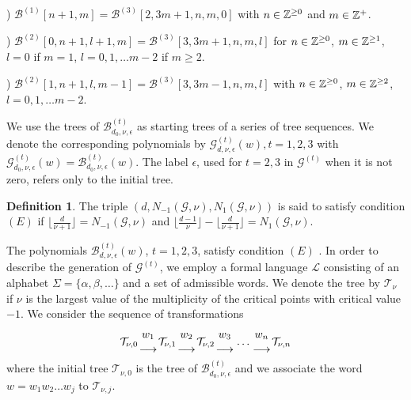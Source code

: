 \documentclass{birkjour_t2}
\theoremstyle{definition}
\newtheorem{defn}[thm]{Definition}
\theoremstyle{remark}
\numberwithin{equation}{section}
\begin{document}
 \bigskip\par{}) ${\mathcal{B}}^{(1)}[n+1, m]={\mathcal{B}}^{(3)}[2, 3m+1,n,m,0]$ with $n\in {\Bbb{Z}}^{\geq 0}$ and $m\in {\Bbb{Z}}^{+}$. 
 \bigskip\par{}) ${\mathcal{B}}^{(2)}[0, n+1, l+1, m]={\mathcal{B}}^{(3)}[3, 3m+1,n,m,l]$ for $n\in {\Bbb{Z}}^{\geq 0}$,  $m\in {\Bbb{Z}}^{\geq 1}$, $l=0$ if $m=1$, $l=0,1, \dots m-2$ if $m \geq 2$.
\bigskip\par{}) ${\mathcal{B}}^{(2)}[1, n+1, l, m-1]={\mathcal{B}}^{(3)}[3, 3m-1, n, m, l]$ with $n\in {\Bbb{Z}}^{\geq 0}$, $m\in {\Bbb{Z}}^{\geq 2}$, $l=0,1, \dots m-2$. 
 \bigskip\par
 We use the trees of ${\mathcal{B}}_{d_{0},\nu,\epsilon}^{(t)}$ as starting trees of a series of tree sequences. 
We denote the corresponding polynomials by ${\mathcal{G}}^{(t)}_{d,\nu,\epsilon}(w), t=1,2, 3$ with ${\mathcal{G}}^{(t)}_{d_{0},\nu,\epsilon}(w)={\mathcal{B}}_{d_{0},\nu,\epsilon}^{(t)}(w)$. The label $\epsilon$, used for $t=2,3$ in ${\mathcal{G}}^{(t)}$ when it is not zero, refers only to the initial tree.
\par
     \begin{defn} 
     The triple $(d,N_{-1}(\mathcal{G}, \nu), N_{1}(\mathcal{G}, \nu))$ is said to satisfy condition $(E)$  if $ \Big \lfloor \frac{d}{\nu+1} \Big \rfloor=N_{-1}(\mathcal{G}, \nu)$ and   $\Big \lfloor \frac{d-1}{\nu}   \Big \rfloor-    \Big \lfloor \frac{d}{\nu+1}   \Big \rfloor=N_{1}(\mathcal{G}, \nu)$.
  
      \end{defn} 
 The polynomials ${\mathcal{B}}^{(t)}_{d,\nu,\epsilon}(w)$, $t=1, 2, 3$, satisfy condition $(E)$ \cite{esc26}.  In order to describe the generation of ${\mathcal{G}}^{(t)}$, we employ a formal language $\mathcal{L}$ consisting of an alphabet $\Sigma=\{\alpha, \beta , \dots  \} $ and a set of admissible words. We denote the tree by $\mathcal{T}_{\nu}$ if $\nu$ is the largest value of the multiplicity of the critical points with critical value $-1$. We consider the sequence of transformations 
   \bigskip\par
       \begin{equation} 
\mathcal{T}_{\nu,0}  { w_{1} \atop \longrightarrow } \mathcal{T}_{\nu,1}  { w_{2} \atop \longrightarrow } \mathcal{T}_{\nu,2} { w_{3} \atop \longrightarrow } \dots { w_{n} \atop \longrightarrow } \mathcal{T}_{\nu,n}  
    \end{equation} 
    where the initial tree $\mathcal{T}_{\nu,0}$ is the tree of ${\mathcal{B}}_{d_{0},\nu,\epsilon}^{(t)}$ and we associate the word $w=w_{1}w_{2} \dots w_{j}$ to  $\mathcal{T}_{\nu,j}$. 
\par\noindent
 
\end{document}
